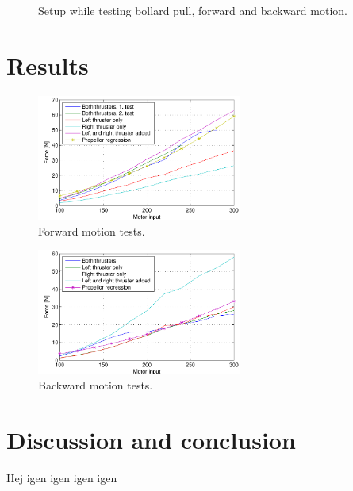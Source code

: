 \begin{figure}[htbp]
	\centering
	
	\caption{Setup while testing bollard pull, forward and backward motion.}
	\label{fig:bollpullsetup}
\end{figure}


\section{Results}
\begin{figure}[htbp]
	\centering
	\includegraphics[width=0.6\textwidth]{plot/forwardthrust}
	\caption{Forward motion tests.}
	\label{fig:bollpullforward}
\end{figure}

\begin{figure}[htbp]
	\centering
	\includegraphics[width=0.6\textwidth]{plot/backthrust}
	\caption{Backward motion tests.}
	\label{fig:bollpullbackward}
\end{figure}

\section{Discussion and conclusion}
Hej igen igen igen igen

